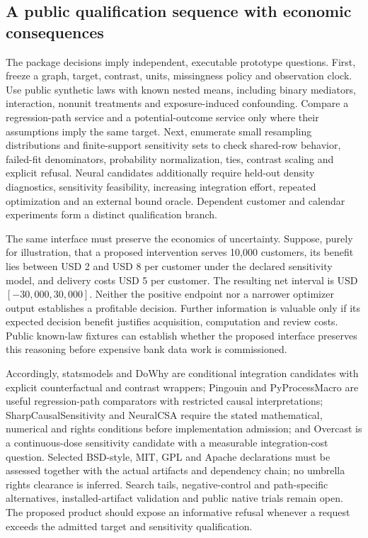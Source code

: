 \subsection{A public qualification sequence with economic consequences}
The package decisions imply independent, executable prototype questions. First, freeze a graph, target, contrast, units, missingness policy and observation clock. Use public synthetic laws with known nested means, including binary mediators, interaction, nonunit treatments and exposure-induced confounding. Compare a regression-path service and a potential-outcome service only where their assumptions imply the same target. Next, enumerate small resampling distributions and finite-support sensitivity sets to check shared-row behavior, failed-fit denominators, probability normalization, ties, contrast scaling and explicit refusal. Neural candidates additionally require held-out density diagnostics, sensitivity feasibility, increasing integration effort, repeated optimization and an external bound oracle. Dependent customer and calendar experiments form a distinct qualification branch. \cite{exec25_pymed_choice}

The same interface must preserve the economics of uncertainty. Suppose, purely for illustration, that a proposed intervention serves 10,000 customers, its benefit lies between USD 2 and USD 8 per customer under the declared sensitivity model, and delivery costs USD 5 per customer. The resulting net interval is USD $[-30{,}000,30{,}000]$. Neither the positive endpoint nor a narrower optimizer output establishes a profitable decision. Further information is valuable only if its expected decision benefit justifies acquisition, computation and review costs. Public known-law fixtures can establish whether the proposed interface preserves this reasoning before expensive bank data work is commissioned. \cite{exec25_pymed_choice}

Accordingly, statsmodels and DoWhy are conditional integration candidates with explicit counterfactual and contrast wrappers; Pingouin and PyProcessMacro are useful regression-path comparators with restricted causal interpretations; SharpCausalSensitivity and NeuralCSA require the stated mathematical, numerical and rights conditions before implementation admission; and Overcast is a continuous-dose sensitivity candidate with a measurable integration-cost question. Selected BSD-style, MIT, GPL and Apache declarations must be assessed together with the actual artifacts and dependency chain; no umbrella rights clearance is inferred. Search tails, negative-control and path-specific alternatives, installed-artifact validation and public native trials remain open. The proposed product should expose an informative refusal whenever a request exceeds the admitted target and sensitivity qualification. \cite{exec25_pymed_statsmodels,exec25_pymed_pingouin,exec25_pymed_dowhy,exec25_pymed_process,exec25_pymed_sharp,exec25_pymed_neuralcsa,exec25_pymed_overcast,exec25_pymed_choice}


